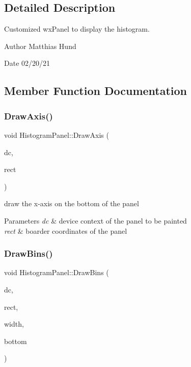 \subsection{Detailed Description}
Customized wx\+Panel to display the histogram. 

\begin{DoxyAuthor}{Author}
Matthias Hund 
\end{DoxyAuthor}
\begin{DoxyDate}{Date}
02/20/21 
\end{DoxyDate}


\subsection{Member Function Documentation}
\mbox{\label{classHistogramPanel_a4ae2b45e5450426cdcd47d1be81da36f}} 
\subsubsection{\texorpdfstring{Draw\+Axis()}{DrawAxis()}}
{\footnotesize\ttfamily void Histogram\+Panel\+::\+Draw\+Axis (\begin{DoxyParamCaption}\item[{wx\+DC \&}]{dc,  }\item[{wx\+Rect \&}]{rect }\end{DoxyParamCaption})\hspace{0.3cm}{\ttfamily [private]}}



draw the x-\/axis on the bottom of the panel 


\begin{DoxyParams}{Parameters}
{\em dc} & device context of the panel to be painted \\
\hline
{\em rect} & boarder coordinates of the panel \\
\hline
\end{DoxyParams}
\mbox{\label{classHistogramPanel_ae17ba2aae2b01ddaeb158dd168829e7d}} 
\subsubsection{\texorpdfstring{Draw\+Bins()}{DrawBins()}}
{\footnotesize\ttfamily void Histogram\+Panel\+::\+Draw\+Bins (\begin{DoxyParamCaption}\item[{wx\+DC \&}]{dc,  }\item[{wx\+Rect \&}]{rect,  }\item[{const int}]{width,  }\item[{const int}]{bottom }\end{DoxyParamCaption})\hspace{0.3cm}{\ttfamily [private]}}




